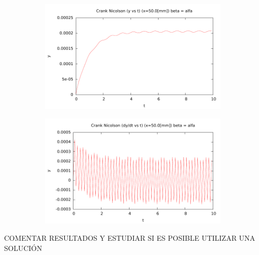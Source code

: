 \begin{center}
\begin{figure} [H]
	\begin{subfigure}[b]{0.3\textwidth}
		\includegraphics{./parte3/graficos/grafico_cn_S2_y_b2.pdf}
		\caption{} 
		\label{fig:cnS2b2_y}
	\end{subfigure}
	
	\begin{subfigure}[b]{0.3\textwidth}
		\includegraphics{./parte3/graficos/grafico_cn_S2_dy_b2.pdf}
		\caption{} 
		\label{fig:cnS2b2_dy}
	\end{subfigure}
\end{figure}

\end{center}


COMENTAR RESULTADOS Y ESTUDIAR SI ES POSIBLE UTILIZAR UNA SOLUCIÓN 